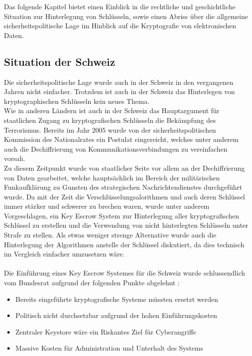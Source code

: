 
Das folgende Kapitel bietet einen Einblick in die rechtliche und geschichtliche Situation zur Hinterlegung von Schlüsseln, sowie einen Abriss über die allgemeine sicherheitspolitische Lage im Hinblick auf die Kryptografie von elektronischen Daten.
	
	
	\subsection{Situation der Schweiz}

Die sicherheitspolitische Lage wurde auch in der Schweiz in den vergangenen Jahren nicht einfacher. Trotzdem ist auch in der Schweiz das Hinterlegen von kryptographischen Schlüsseln kein neues Thema. \\
Wie in anderen Ländern ist auch in der Schweiz das Hauptargument für staatlichen Zugang zu kryptografischen Schlüsseln die Bekämpfung des Terrorismus. Bereits im Jahr 2005 wurde von der sicherheitspolitischen Kommission des Nationalrates ein Postulat eingereicht, welches unter anderem auch die Dechiffrierung von Kommunikationsverbindungen zu vereinfachen vorsah. \cite[S. 5733f]{adminch} \\ 
Zu diesem Zeitpunkt wurde von staatlicher Seite vor allem an der Dechiffrierung von Daten gearbeitet, welche hauptsächlich im Bereich der militärischen Funkaufklärung zu Gunsten des strategischen Nachrichtendienstes durchgeführt wurde. Da mit der Zeit die Verschlüsselungsalorithmen und auch deren Schlüssel immer stärker und schwerer zu brechen waren, wurde unter anderem Vorgeschlagen, ein Key Escrow System zur Hinterlegung aller kryptografischen Schlüssel zu erstellen und die Verwendung von nicht hinterlegten Schlüsseln unter Strafe zu stellen. Als etwas weniger strenge Alternative wurde auch die Hinterlegung der Algorithmen anstelle der Schlüssel diskutiert, da dies technisch im Vergleich einfacher umzusetzen wäre. \cite[S. 5733f]{adminch} \\ 
\\
Die Einführung eines Key Escrow Systemes für die Schweiz wurde schlussendlich vom Bundesrat aufgrund der folgenden Punkte abgelehnt \cite[S. 5735]{adminch}: 

\begin{itemize}
  \item Bereits eingeführte kryptografische Systeme müssten ersetzt werden
  \item Politisch nicht durchsetzbar aufgrund der hohen Einführungskosten
  \item Zentraler Keystore wäre ein Riskantes Ziel für Cyberangriffe
  \item Massive Kosten für Administration und Unterhalt des Systems
\end{itemize}

